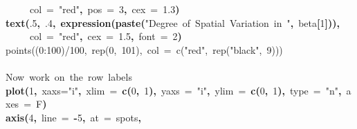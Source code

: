 \documentclass{article}
\makeatletter
\newcommand{\hlnumber}[1]{\textcolor[rgb]{0,0,0}{#1}}%
\newcommand{\hlfunctioncall}[1]{\textcolor[rgb]{0.501960784313725,0,0.329411764705882}{\textbf{#1}}}%
\newcommand{\hlstring}[1]{\textcolor[rgb]{0.6,0.6,1}{#1}}%
\newcommand{\hlkeyword}[1]{\textcolor[rgb]{0,0,0}{\textbf{#1}}}%
\newcommand{\hlargument}[1]{\textcolor[rgb]{0.690196078431373,0.250980392156863,0.0196078431372549}{#1}}%
\newcommand{\hlcomment}[1]{\textcolor[rgb]{0.180392156862745,0.6,0.341176470588235}{#1}}%
\newcommand{\hlsymbol}[1]{\textcolor[rgb]{0,0,0}{#1}}%
\newcommand{\hlstd}[1]{\textcolor[rgb]{0,0,0}{#1}}%
\newenvironment{kframe}{%
 \def\FrameCommand##1{\hskip\@totalleftmargin \hskip-\fboxsep
 \colorbox{shadecolor}{##1}\hskip-\fboxsep
     \hskip-\linewidth \hskip-\@totalleftmargin \hskip\columnwidth}%
 \MakeFramed {\advance\hsize-\width
   \@totalleftmargin\z@ \linewidth\hsize
   \@setminipage}}%
 {\par\unskip\endMakeFramed}
\newenvironment{knitrout}{}{} %
\makeatother
\begin{document}
\begin{knitrout}
\begin{kframe}
\begin{flushleft}
\hlstd{}{\ }{\ }{\ }{\ }{\ }\hlargument{col}{\ }\hlargument{=}{\ }\hlstring{"{}red"{}}\hlkeyword{,}{\ }\hlargument{pos}{\ }\hlargument{=}{\ }\hlnumber{3}\hlkeyword{,}{\ }\hlargument{cex}{\ }\hlargument{=}{\ }\hlnumber{1.3}\hlkeyword{)}\hspace*{\fill}\\
\hlstd{}\hlfunctioncall{text}\hlkeyword{(}\hlnumber{.5}\hlkeyword{,}{\ }\hlnumber{.4}\hlkeyword{,}{\ }\hlfunctioncall{expression}\hlkeyword{(}\hlfunctioncall{paste}\hlkeyword{(}\hlstring{"{}Degree{\ }of{\ }Spatial{\ }Variation{\ }in{\ }"{}}\hlkeyword{,}{\ }\hlsymbol{beta}\hlkeyword{[}\hlnumber{1}\hlkeyword{]}\hlkeyword{)}\hlkeyword{)}\hlkeyword{,}\hspace*{\fill}\\
\hlstd{}{\ }{\ }{\ }{\ }{\ }\hlargument{col}{\ }\hlargument{=}{\ }\hlstring{"{}red"{}}\hlkeyword{,}{\ }\hlargument{cex}{\ }\hlargument{=}{\ }\hlnumber{1.5}\hlkeyword{,}{\ }\hlargument{font}{\ }\hlargument{=}{\ }\hlnumber{2}\hlkeyword{)}\hspace*{\fill}\\
\hlstd{}\hlcomment{\usebox{\hlnormalsizeboxhash}points((0:100)/100,{\ }rep(0,{\ }101),{\ }col{\ }={\ }c("{}red"{},{\ }rep("{}black"{},{\ }9)))}\hspace*{\fill}\\
\hlstd{}\hspace*{\fill}\\
\hlstd{}\hlcomment{\usebox{\hlnormalsizeboxhash}{\ }Now{\ }work{\ }on{\ }the{\ }row{\ }labels}\hspace*{\fill}\\
\hlstd{}\hlfunctioncall{plot}\hlkeyword{(}\hlnumber{1}\hlkeyword{,}{\ }\hlargument{xaxs}\hlargument{=}\hlstring{"{}i"{}}\hlkeyword{,}{\ }\hlargument{xlim}{\ }\hlargument{=}{\ }\hlfunctioncall{c}\hlkeyword{(}\hlnumber{0}\hlkeyword{,}{\ }\hlnumber{1}\hlkeyword{)}\hlkeyword{,}{\ }\hlargument{yaxs}{\ }\hlargument{=}{\ }\hlstring{"{}i"{}}\hlkeyword{,}{\ }\hlargument{ylim}{\ }\hlargument{=}{\ }\hlfunctioncall{c}\hlkeyword{(}\hlnumber{0}\hlkeyword{,}{\ }\hlnumber{1}\hlkeyword{)}\hlkeyword{,}{\ }\hlargument{type}{\ }\hlargument{=}{\ }\hlstring{"{}n"{}}\hlkeyword{,}{\ }\hlargument{axes}{\ }\hlargument{=}{\ }\hlsymbol{F}\hlkeyword{)}\hspace*{\fill}\\
\hlstd{}\hlfunctioncall{axis}\hlkeyword{(}\hlnumber{4}\hlkeyword{,}{\ }\hlargument{line}{\ }\hlargument{=}{\ }\hlkeyword{-}\hlnumber{5}\hlkeyword{,}{\ }\hlargument{at}{\ }\hlargument{=}{\ }\hlsymbol{spots}\hlkeyword{,}\hspace*{\fill}\\

\end{flushleft}
\end{kframe}
\end{knitrout}
\end{document}
